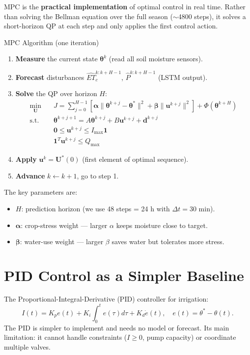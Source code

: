 \documentclass[12pt,a4paper,openany]{book}
\newcommand{\bu}{\bm{u}}
\newcommand{\bth}{\bm{\theta}}
\begin{document}
MPC is the \textbf{practical implementation} of optimal control in real time. Rather than solving the Bellman equation over the full season ($\sim$4800 steps), it solves a short-horizon QP at each step and only applies the first control action.

\begin{thmbox}{MPC Algorithm (one iteration)}
\begin{enumerate}[leftmargin=2em,label=\arabic*.]
  \item \textbf{Measure} the current state $\bth^k$ (read all soil moisture sensors).
  \item \textbf{Forecast} disturbances $\hat{ET}_c^{k:k+H-1}$, $\hat P^{k:k+H-1}$ (LSTM output).
  \item \textbf{Solve} the QP over horizon $H$:
    \begin{align}
      \min_{\mathbf{U}}\quad&J=\sum_{j=0}^{H-1}\!\left[\bm{\alpha}\|\bth^{k+j}-\bth^*\|^2+\bm{\beta}\|\bu^{k+j}\|^2\right]+\Phi(\bth^{k+H})\\
      \text{s.t.}\quad&\bth^{k+j+1}=A\bth^{k+j}+B\bu^{k+j}+\bm{d}^{k+j}\\
      &\bm{0}\leq\bu^{k+j}\leq I_{\max}\bm{1}\\
      &\bm{1}^T\bu^{k+j}\leq Q_{\max}
    \end{align}
  \item \textbf{Apply} $\bu^k=\mathbf{U}^*(0)$ (first element of optimal sequence).
  \item \textbf{Advance} $k\leftarrow k+1$, go to step 1.
\end{enumerate}
\end{thmbox}

The key parameters are:
\begin{itemize}[leftmargin=2em]
  \item $H$: prediction horizon (we use 48 steps = 24 h with $\Delta t=30$ min).
  \item $\bm{\alpha}$: crop-stress weight — larger $\alpha$ keeps moisture close to target.
  \item $\bm{\beta}$: water-use weight — larger $\beta$ saves water but tolerates more stress.
\end{itemize}

\section{PID Control as a Simpler Baseline}

The Proportional-Integral-Derivative (PID) controller for irrigation:
\begin{equation}
  I(t) = K_p e(t) + K_i\int_0^t e(\tau)d\tau + K_d\dot e(t),\quad e(t)=\theta^*-\theta(t).
\end{equation}
The PID is simpler to implement and needs no model or forecast. Its main limitation: it cannot handle constraints ($I\geq0$, pump capacity) or coordinate multiple valves.
\end{document}
